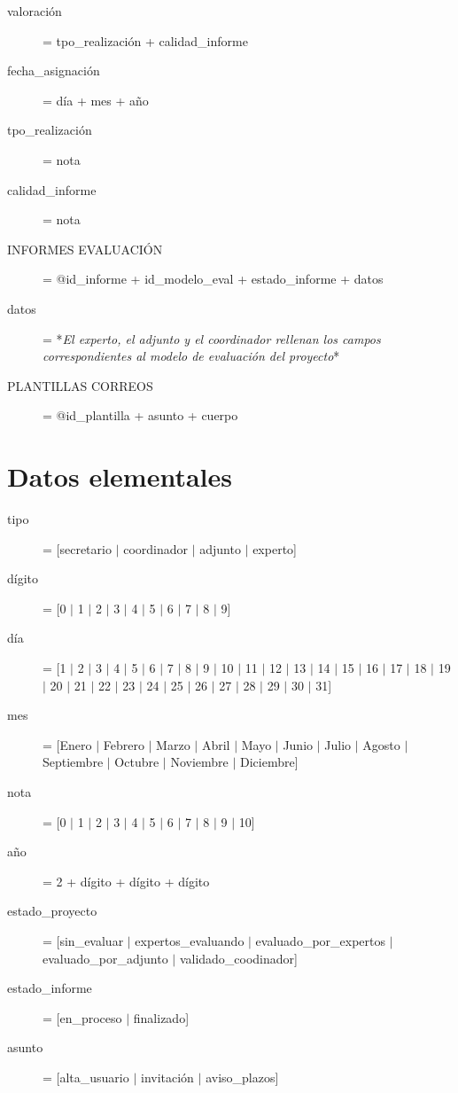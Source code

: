 \documentclass[12pt,a4paper,spanish,twoside]{book}
\begin{document}
\begin{description}
\item[valoración] = tpo\_realización + calidad\_informe

\item[fecha\_asignación] = día + mes + año

\item[tpo\_realización] = nota

\item[calidad\_informe] = nota

\item[INFORMES EVALUACIÓN] = @id\_informe + id\_modelo\_eval +
  estado\_informe + datos 

\item[datos] = *\emph{El experto, el adjunto y el coordinador rellenan los
    campos correspondientes al modelo de evaluación del proyecto}* 

\item[PLANTILLAS CORREOS] = @id\_plantilla + asunto + cuerpo
\end{description}

\section{Datos elementales}
\begin{description}
\item[tipo] = [secretario $\mid$ coordinador $\mid$ adjunto $\mid$ experto]

\item[dígito] = [0 $\mid$ 1 $\mid$ 2 $\mid$ 3 $\mid$ 4 $\mid$ 5 $\mid$ 6
  $\mid$ 7 $\mid$ 8 $\mid$ 9] 

\item[día] = [1 $\mid$ 2 $\mid$ 3 $\mid$ 4 $\mid$ 5 $\mid$ 6 $\mid$ 7 $\mid$
  8 $\mid$ 9 $\mid$ 10 $\mid$ 11 $\mid$ 12 $\mid$ 13 $\mid$ 14 $\mid$ 15
  $\mid$ 16 $\mid$ 17 $\mid$ 18 $\mid$ 19 $\mid$ 20 $\mid$ 21 $\mid$ 22
  $\mid$ 23 $\mid$ 24 $\mid$ 25 $\mid$ 26 $\mid$ 27 $\mid$ 28 $\mid$ 29
  $\mid$ 30 $\mid$ 31] 

\item[mes] = [Enero $\mid$ Febrero $\mid$ Marzo $\mid$ Abril $\mid$ Mayo
  $\mid$ Junio $\mid$ Julio $\mid$ Agosto $\mid$ Septiembre $\mid$ Octubre
  $\mid$ Noviembre $\mid$ Diciembre] 

\item[nota] = [0 $\mid$ 1 $\mid$ 2 $\mid$ 3 $\mid$ 4 $\mid$ 5 $\mid$ 6 $\mid$
  7 $\mid$ 8 $\mid$ 9 $\mid$ 10] 

\item[año] = 2 + dígito + dígito + dígito

\item[estado\_proyecto] = [sin\_evaluar $\mid$ expertos\_evaluando $\mid$
  evaluado\_por\_expertos $\mid$ evaluado\_por\_adjunto $\mid$
  validado\_coodinador] 

\item[estado\_informe] = [en\_proceso $\mid$ finalizado]

\item[asunto] = [alta\_usuario $\mid$ invitación $\mid$ aviso\_plazos]
\end{description}
\end{document}
